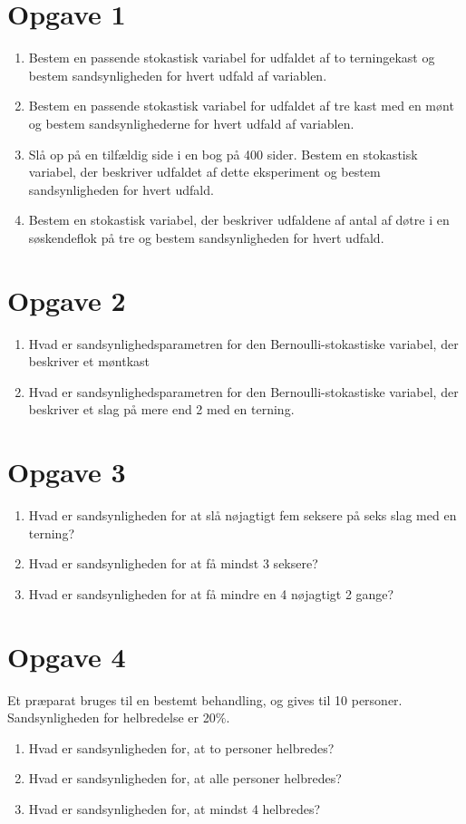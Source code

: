 \section*{Opgave 1}
\begin{enumerate}[label=\roman*)]
\item Bestem en passende stokastisk variabel for udfaldet af to terningekast og bestem sandsynligheden for hvert udfald af variablen. 
\item Bestem en passende stokastisk variabel for udfaldet af tre kast med en mønt og bestem sandsynlighederne for hvert udfald af variablen. 
\item Slå op på en tilfældig side i en bog på 400 sider. Bestem en stokastisk variabel, der beskriver udfaldet af dette eksperiment og bestem sandsynligheden for hvert udfald. 
\item Bestem en stokastisk variabel, der beskriver udfaldene af antal af døtre i en søskendeflok på tre og bestem sandsynligheden for hvert udfald. 
\end{enumerate}
\section*{Opgave 2}
\begin{enumerate}[label=\roman*)]
\item Hvad er sandsynlighedsparametren for den Bernoulli-stokastiske variabel, der beskriver et møntkast
\item Hvad er sandsynlighedsparametren for den Bernoulli-stokastiske variabel, der beskriver et slag på mere end 2 med en terning.
\end{enumerate}
\section*{Opgave 3}
\begin{enumerate}[label=\roman*)]
\item Hvad er sandsynligheden for at slå nøjagtigt fem seksere på seks slag med en terning?
\item Hvad er sandsynligheden for at få mindst 3 seksere?
\item Hvad er sandsynligheden for at få mindre en 4 nøjagtigt 2 gange?
\end{enumerate}
\section*{Opgave 4}
Et præparat bruges til en bestemt behandling, og gives til 10 personer. Sandsynligheden for helbredelse er 20$\%$. 
\begin{enumerate}[label=\roman*)]
\item Hvad er sandsynligheden for, at to personer helbredes?
\item Hvad er sandsynligheden for, at alle personer helbredes?
\item Hvad er sandsynligheden for, at mindst 4 helbredes? 
\end{enumerate}